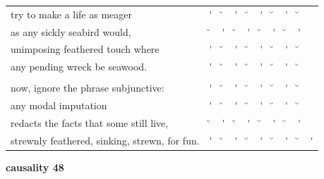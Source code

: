 \documentclass[12pt, landscape]{article}
\begin{document}
\begin{center}
\begin{tabularx}{\textwidth}{
>{\lefting\arraybackslash}X
c
c
c
c
c
c
c
c
c
}

try to make a life as meager & \'{} & \u{} & \'{} & \u{} & \'{} & \u{} & \'{} & \u{} & \\
as any sickly seabird would, & \u{} & \'{} & \u{} & \'{} & \u{} & \'{} & \u{} & \'{} & \\
unimposing feathered touch where & \'{} & \u{} & \'{} & \u{} & \'{} & \u{} & \'{} & \u{} & \\
any pending wreck be seawood. & \'{} & \u{} & \'{} & \u{} & \'{} & \u{} & \'{} & \u{} & \\
 & & & & & & & & \\
now, ignore the phrase subjunctive: & \'{} & \u{} & \'{} & \u{} & \'{} & \u{} & \'{} & \u{} & \\
any modal imputation & \'{} & \u{} & \'{} & \u{} & \'{} & \u{} & \'{} & \u{} & \\
redacts the facts that some still live, & \u{} & \'{} & \u{} & \'{} & \u{} & \'{} & \u{} & \'{} & \\
strewnly feathered, sinking, strewn, for fun. & \'{} & \u{} & \'{} & \u{} & \'{} & \u{} & \'{} & \u{} & \'{} \\

\end{tabularx}
\end{center}

\vspace*{\fill}

\newpage

\vspace*{\fill}

\noindent \textbf{causality 48}
\noindent \hfill \par
\end{document}
